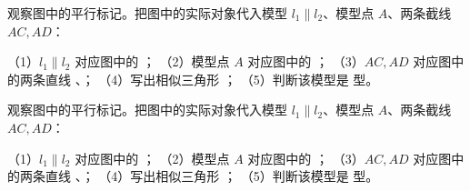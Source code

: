 \documentclass{exam-zh}
\begin{document}
\begin{problem}[points=10]
  \noindent
  \begin{minipage}[t]{\dimexpr\linewidth-60mm-6mm\relax}
    \vspace{0pt}
    观察图中的平行标记。把图中的实际对象代入模型 $l_1\parallel l_2$、模型点 $A$、两条截线 $AC,AD$：

（1）$l_1\parallel l_2$ 对应图中的 \underline{\hspace{2cm}}；
（2）模型点 $A$ 对应图中的 \underline{\hspace{1cm}}；
（3）$AC,AD$ 对应图中的两条直线 \underline{\hspace{1.8cm}}、\underline{\hspace{1.8cm}}；
（4）写出相似三角形 \underline{\hspace{4cm}}；
（5）判断该模型是 \underline{\hspace{1.5cm}} 型。


  \end{minipage}\hfill
  \begin{diagramcoltikz}{60mm}{第 2 题图}
  }
  \end{diagramcoltikz}
  \par\medskip
  \answerarea[34mm]
\end{problem}



\begin{problem}[points=10]
  \noindent
  \begin{minipage}[t]{\dimexpr\linewidth-60mm-6mm\relax}
    \vspace{0pt}
    观察图中的平行标记。把图中的实际对象代入模型 $l_1\parallel l_2$、模型点 $A$、两条截线 $AC,AD$：

（1）$l_1\parallel l_2$ 对应图中的 \underline{\hspace{2cm}}；
（2）模型点 $A$ 对应图中的 \underline{\hspace{1cm}}；
（3）$AC,AD$ 对应图中的两条直线 \underline{\hspace{1.8cm}}、\underline{\hspace{1.8cm}}；
（4）写出相似三角形 \underline{\hspace{4cm}}；
（5）判断该模型是 \underline{\hspace{1.5cm}} 型。


  \end{minipage}\hfill
  \begin{diagramcoltikz}{60mm}{第 3 题图}
  }
  \end{diagramcoltikz}
  \par\medskip
  \answerarea[34mm]
\end{problem}
\end{document}
